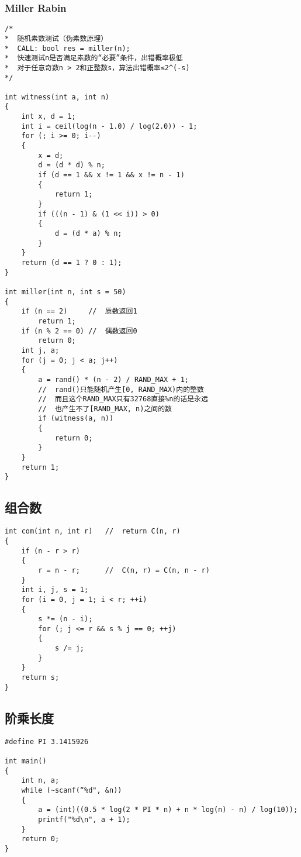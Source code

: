 \subsubsection{Miller Rabin}
\begin{lstlisting}
/*
*  随机素数测试（伪素数原理）
*  CALL: bool res = miller(n);
*  快速测试n是否满足素数的“必要”条件，出错概率极低
*  对于任意奇数n > 2和正整数s，算法出错概率≤2^(-s)
*/

int witness(int a, int n)
{
	int x, d = 1;
	int i = ceil(log(n - 1.0) / log(2.0)) - 1;
	for (; i >= 0; i--)
	{
		x = d;
		d = (d * d) % n;
		if (d == 1 && x != 1 && x != n - 1)
		{
			return 1;
		}
		if (((n - 1) & (1 << i)) > 0)
		{
			d = (d * a) % n;
		}
	}
	return (d == 1 ? 0 : 1);
}

int miller(int n, int s = 50)
{
	if (n == 2)     //  质数返回1
		return 1;
	if (n % 2 == 0) //  偶数返回0
		return 0;
	int j, a;
	for (j = 0; j < a; j++)
	{
		a = rand() * (n - 2) / RAND_MAX + 1;
		//  rand()只能随机产生[0, RAND_MAX)内的整数
		//  而且这个RAND_MAX只有32768直接%n的话是永远
		//  也产生不了[RAND_MAX, n)之间的数
		if (witness(a, n))
		{
			return 0;
		}
	}
	return 1;
}
\end{lstlisting}

\subsection{组合数}
\begin{lstlisting}
int com(int n, int r)   //  return C(n, r)
{
	if (n - r > r)
	{
		r = n - r;      //  C(n, r) = C(n, n - r)
	}
	int i, j, s = 1;
	for (i = 0, j = 1; i < r; ++i)
	{
		s *= (n - i);
		for (; j <= r && s % j == 0; ++j)
		{
			s /= j;
		}
	}
	return s;
}
\end{lstlisting}

\subsection{阶乘长度}
\begin{lstlisting}
#define PI 3.1415926

int main()
{
	int n, a;
	while (~scanf(“%d", &n))
	{
		a = (int)((0.5 * log(2 * PI * n) + n * log(n) - n) / log(10));
		printf("%d\n", a + 1);
	}
	return 0;
}
\end{lstlisting}

